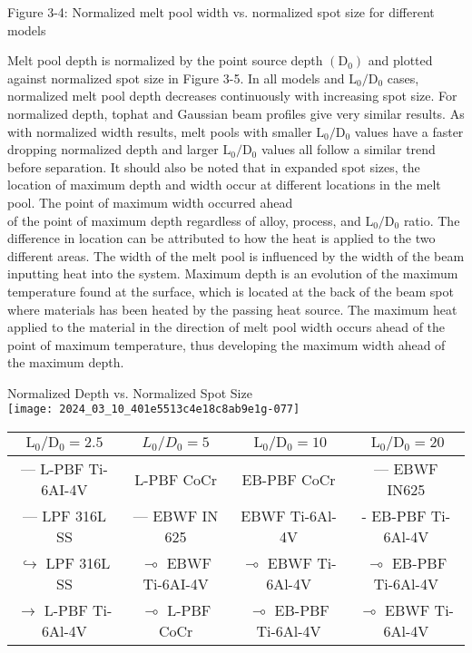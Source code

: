 \documentclass[10pt]{article}
\begin{document}
Figure 3-4: Normalized melt pool width vs. normalized spot size for different models

Melt pool depth is normalized by the point source depth $\left(\mathrm{D}_{0}\right)$ and plotted against normalized spot size in Figure 3-5. In all models and $\mathrm{L}_{0} / \mathrm{D}_{0}$ cases, normalized melt pool depth decreases continuously with increasing spot size. For normalized depth, tophat and Gaussian beam profiles give very similar results. As with normalized width results, melt pools with smaller $\mathrm{L}_{0} / \mathrm{D}_{0}$ values have a faster dropping normalized depth and larger $\mathrm{L}_{0} / \mathrm{D}_{0}$ values all follow a similar trend before separation. It should also be noted that in expanded spot sizes, the location of maximum depth and width occur at different locations in the melt pool. The point of maximum width occurred ahead\\
of the point of maximum depth regardless of alloy, process, and $\mathrm{L}_{0} / \mathrm{D}_{0}$ ratio. The difference in location can be attributed to how the heat is applied to the two different areas. The width of the melt pool is influenced by the width of the beam inputting heat into the system. Maximum depth is an evolution of the maximum temperature found at the surface, which is located at the back of the beam spot where materials has been heated by the passing heat source. The maximum heat applied to the material in the direction of melt pool width occurs ahead of the point of maximum temperature, thus developing the maximum width ahead of the maximum depth.

Normalized Depth vs. Normalized Spot Size\\
\texttt{[image: 2024\_03\_10\_401e5513c4e18c8ab9e1g-077]}

\begin{center}
\begin{tabular}{|c|c|c|c|}
\hline
$\mathrm{L}_{0} / \mathrm{D}_{0}=2.5$ & $L_{0} / D_{0}=5$ & $\mathrm{~L}_{0} / \mathrm{D}_{0}=10$ & $\mathrm{~L}_{0} / \mathrm{D}_{0}=20$ \\
\hline
— L-PBF Ti-6AI-4V & L-PBF CoCr & EB-PBF CoCr & — EBWF IN625 \\
\hline
— LPF 316L SS & — EBWF IN 625 & EBWF Ti-6Al-4V & - EB-PBF Ti-6Al-4V \\
\hline
$\hookrightarrow$ LPF 316L SS & $\multimap$ EBWF Ti-6AI-4V & $\multimap$ EBWF Ti-6Al-4V & $\multimap$ EB-PBF Ti-6Al-4V \\
\hline
$\rightarrow$ L-PBF Ti-6Al-4V & $\multimap$ L-PBF CoCr & $\multimap$ EB-PBF Ti-6Al-4V & $\multimap$ EBWF Ti-6Al-4V \\
\hline
\end{tabular}
\end{center}
\end{document}
